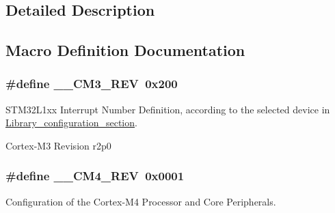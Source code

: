 \subsection{Detailed Description}


\subsection{Macro Definition Documentation}
\hypertarget{group___configuration__section__for___c_m_s_i_s_gac6a3f185c4640e06443c18b3c8d93f53}{
\subsubsection[{\-\_\-\-\_\-\-C\-M3\-\_\-\-R\-E\-V}]{\setlength{\rightskip}{0pt plus 5cm}\#define \-\_\-\-\_\-\-C\-M3\-\_\-\-R\-E\-V~0x200}}\label{group___configuration__section__for___c_m_s_i_s_gac6a3f185c4640e06443c18b3c8d93f53}


S\-T\-M32\-L1xx Interrupt Number Definition, according to the selected device in \hyperlink{group___library__configuration__section}{Library\-\_\-configuration\-\_\-section}. 

Cortex-\/\-M3 Revision r2p0 \hypertarget{group___configuration__section__for___c_m_s_i_s_ga45a97e4bb8b6ce7c334acc5f45ace3ba}{
\subsubsection[{\-\_\-\-\_\-\-C\-M4\-\_\-\-R\-E\-V}]{\setlength{\rightskip}{0pt plus 5cm}\#define \-\_\-\-\_\-\-C\-M4\-\_\-\-R\-E\-V~0x0001}}\label{group___configuration__section__for___c_m_s_i_s_ga45a97e4bb8b6ce7c334acc5f45ace3ba}


Configuration of the Cortex-\/\-M4 Processor and Core Peripherals. 

